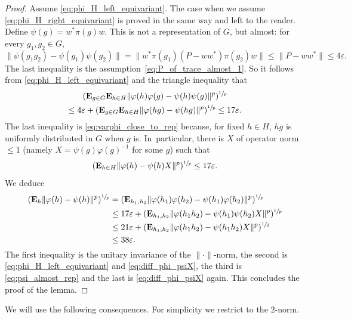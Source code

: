 \documentclass[JEP,XML,SOM,Unicode,published]{cedram}
\theoremstyle{plain}
\theoremstyle{definition}
\newcommand{\E}{\mathbf{E}}
\begin{document}
\begin{proof}
Assume \eqref{eq:phi_H_left_equivariant}. The case when we assume \eqref{eq:phi_H_right_equivariant} is proved in the same way and left to the reader. Define $\psi(g) = w^* \pi(g) w$. This is not a representation of $G$, but almost: for every $g_1,g_2 \in G$,\vspace*{-3pt}
\begin{equation}\label{eq:psi_almost_rep} \| \psi(g_1g_2) - \psi(g_1)\psi(g_2)\| = \| w^* \pi(g_1) (P-ww^*) \pi(g_2) w\| \leq \|P-ww^*\| \leq 4\varepsilon.
\end{equation}
The last inequality is the assumption~\eqref{eq:P_of_trace_almost_1}. So it follows from \eqref{eq:phi_H_left_equivariant} and the triangle inequality that\vspace*{-5pt}
\begin{multline*} (\E_{g \in G} \E_{h \in H} \|\varphi(h)\varphi(g) - \psi(h) \psi(g)\|^p)^{\sfrac 1 p} \\\leq 4\varepsilon + (\E_{g \in G} \E_{h \in H} \|\varphi(hg) - \psi(hg)\|^p)^{\sfrac 1 p} \leq 17 {\varepsilon}.
\end{multline*}
The last inequality is \eqref{eq:varphi_close_to_rep} because, for fixed $h \in H$, $hg$ is uniformly distributed in $G$ when $g$ is. In~particular, there is $X$ of operator norm $\leq 1$ (namely $X=\psi(g) \varphi(g)^{-1}$ for some $g$) such that
\begin{equation}\label{eq:diff_phi_psiX} (\E_{h \in H} \|\varphi(h) - \psi(h) X\|^p)^{\sfrac 1 p} \leq 17 {\varepsilon}.
\end{equation}
We deduce
\begin{align*}
(\E_h \|\varphi(h) - \psi(h)\|^p)^{\sfrac 1 p} & = (\E_{h_1,h_2} \|\varphi(h_1)\varphi(h_2) - \psi(h_1) \varphi(h_2)\|^p)^{\sfrac 1 p} \\
& \leq 17{\varepsilon}+ (\E_{h_1,h_2} \|\varphi(h_1h_2) - \psi(h_1) \psi(h_2) X\|^p)^{\sfrac 1 p}\\
&\leq 21{\varepsilon}+ (\E_{h_1,h_2} \|\varphi(h_1h_2) - \psi(h_1h_2)X\|^p)^{\sfrac 1 2}\\
&\leq 38{\varepsilon}.
\end{align*}
The first inequality is the unitary invariance of the $\|{\cdot}\|$-norm, the second is \eqref{eq:phi_H_left_equivariant} and \eqref{eq:diff_phi_psiX}, the third is \eqref{eq:psi_almost_rep} and the last is \eqref{eq:diff_phi_psiX} again. This concludes the proof of the lemma.
\end{proof}
We will use the following consequences. For simplicity we restrict to the $2$-norm.
\end{document}
